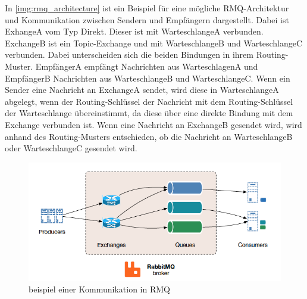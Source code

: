 In \autoref{img:rmq_architecture} ist ein Beispiel für eine mögliche RMQ-Architektur und Kommunikation zwischen Sendern und Empfängern dargestellt. Dabei ist ExhangeA vom Typ Direkt. Dieser ist mit WarteschlangeA verbunden. ExchangeB ist ein Topic-Exchange und mit WarteschlangeB und WarteschlangeC verbunden. Dabei unterscheiden sich die beiden Bindungen in ihrem Routing-Muster. EmpfängerA empfängt Nachrichten aus WarteschlagenA und EmpfängerB Nachrichten aus WarteschlangeB und WarteschlangeC. Wenn ein Sender eine Nachricht an ExchangeA sendet, wird diese in WarteschlangeA abgelegt, wenn der Routing-Schlüssel der Nachricht mit dem Routing-Schlüssel der Warteschlange übereinstimmt, da diese über eine direkte Bindung mit dem Exchange verbunden ist. Wenn eine Nachricht an ExchangeB gesendet wird, wird anhand des Routing-Musters entschieden, ob die Nachricht an WarteschlangeB oder WarteschlangeC gesendet wird. 
\begin{figure}
\center
  \includegraphics[width=1\textwidth]{images/measurement/rmqexample.png}
  \caption{beispiel einer Kommunikation in RMQ}
  \label{img:rmq_architecture}
\end{figure}

